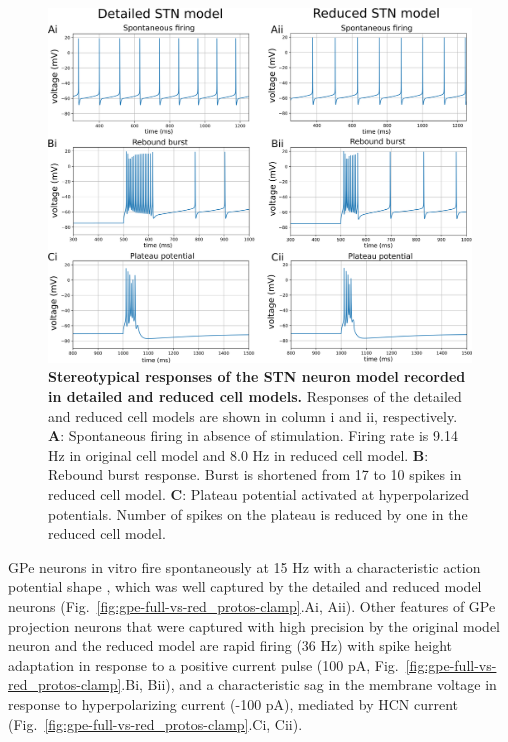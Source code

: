 \begin{figure}[ht]
\centering
\includegraphics[width=\textwidth]{ch_reduced_model/figs/fig_stn-full-vs-red_protos-clamp.png}
\caption{\textbf{Stereotypical responses of the \cite{gillies_membrane_2005} STN neuron model recorded in detailed and reduced cell models.}
Responses of the detailed and reduced cell models are shown in column i and ii, respectively.
\textbf{A}: Spontaneous firing in absence of stimulation. Firing rate is 9.14 Hz in original cell model
and 8.0 Hz in reduced cell model.
\textbf{B}: Rebound burst response. Burst is shortened from 17 to 10 spikes in reduced cell model.
\textbf{C}: Plateau potential activated at hyperpolarized potentials. Number of spikes on the plateau
is reduced by one in the reduced cell model.}
\label{fig:stn-full-vs-red_protos-clamp}
\end{figure}

%
%

GPe neurons in vitro fire spontaneously at 15 Hz with a characteristic
action potential shape \cite{gunay_channel_2008}, which was well captured by the
detailed and reduced model neurons (Fig.~\ref{fig:gpe-full-vs-red_protos-clamp}.Ai, Aii).
%
Other features of GPe projection neurons that were captured with high precision by the original
model neuron \cite{gunay_channel_2008} and the reduced model are rapid firing (36 Hz)
with spike height adaptation in response to a positive current pulse
(100 pA, Fig.~\ref{fig:gpe-full-vs-red_protos-clamp}.Bi, Bii),
and a characteristic sag in the membrane voltage in response to hyperpolarizing current
(-100 pA), mediated by HCN current (Fig.~\ref{fig:gpe-full-vs-red_protos-clamp}.Ci, Cii).


